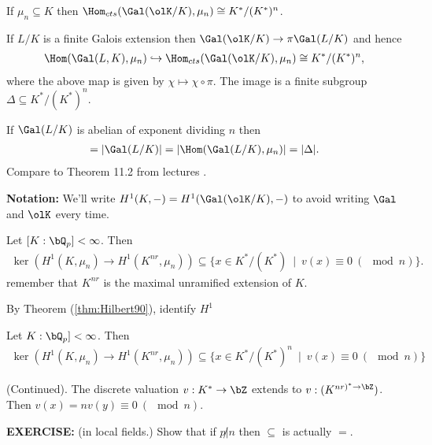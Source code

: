 If $\mu_n \subseteq K$ then $\Hom_{cts}(\Gal(\olK/K),\mu_n)\cong K^*/(K^*)^n$.

If $L/K$ is a finite Galois extension then $\Gal(\olK/K) \to{\pi} \Gal(L/K)$ and hence
\begin{align*}
	\Hom(\Gal(L,K),\mu_n) \hookrightarrow \Hom_{cts}(\Gal(\olK/K),\mu_n) \cong  K^*/(K^*)^n,
\end{align*}
where the above map is given by $\chi \mapsto \chi \circ \pi$. The image is a finite subgroup $\Delta \subseteq K^*/(K^*)^n$. 

If $\Gal(L/K)$ is abelian of exponent dividing $n$ then
\begin{align*}
	[L:K] = |\Gal(L/K)| = |\Hom(\Gal(L/K),\mu_n)| = |\Delta|.
\end{align*}
Compare to Theorem 11.2 from lectures .

\textbf{Notation:} We'll write $H^1(K,-) = H^1(\Gal(\olK/K),-)$ to avoid writing $\Gal$ and $\olK$ every time.

\begin{lem}\label{lem:finite-padic-ext}
	Let $[K:\bQ_p] < \infty$. Then
	\begin{align*}
		\ker(H^1(K,\mu_n) \to H^1(K^{nr},\mu_n)) \subseteq \{x \in K^*/(K^*) ~ \mid~ v(x) \equiv 0 ~ (\mod n)\}.
	\end{align*}
	remember that $K^{nr}$ is the maximal unramified extension of $K$.
\end{lem}
\begin{prf}
	By Theorem (\ref{thm:Hilbert90}), identify $H^1$
\end{prf}

\begin{lem}\label{lem:ker-of-H1}
	Let $K:\bQ_p] < \infty$. Then
	\begin{align*}
		\ker(H^1(K,\mu_n)\to H^1(K^{nr},\mu_n)) \subseteq \{ x \in K^*/(K^*)^n ~ \mid ~ v(x) \equiv 0 ~(\mod n)\}
	\end{align*}
\end{lem}
\begin{prf}
	(Continued). The discrete valuation $v: K^*\to \bZ$ extends to $v:(K^{nr)^* \to \bZ})$. Then $v(x) = nv(y) \equiv 0 ~(\mod n)$.
\end{prf}

\textbf{EXERCISE:} (in local fields.) Show that if $p \not | n$ then $\subseteq$ is actually $=$.

